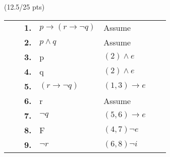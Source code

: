 \documentclass[a4paper,12pt]{article}
\begin{document}
\hfill \small{(12.5/25 pts)}\\
\begin{tcolorbox}
\begin{tabular}{|l|lrlll|l|} 
\hline
\multicolumn{1}{|l}{} &                       & \textbf{1.}  & $p\rightarrow (r\rightarrow \neg q)$                                               & Assume                                   & \multicolumn{1}{l}{} &                       \\ 
\cline{2-6}
                      &                       & \textbf{2.}  & $p\wedge q$                                                                        & Assume                                   &                      &                       \\
                      &                       & \textbf{3.}  & p                                                                                  & $(2) \wedge e $                              &                      &                       \\
                      &                       & \textbf{4.}  & q                                                                                  & $(2) \wedge e $                              &                      &                       \\
                      &                       & \textbf{5.}  & $(r\rightarrow \neg q)$                                                            & $(1, 3) \rightarrow e $                      &                      &                       \\ 
\cline{3-5}
                      & \multicolumn{1}{l|}{} & \textbf{6.}  & r                                                                                  & \multicolumn{1}{l|}{Assume}              &                      &                       \\
                      & \multicolumn{1}{l|}{} & \textbf{7.}  & $ \neg q $                                                                         & \multicolumn{1}{l|}{$(5, 6) \rightarrow e$ } &                      &                       \\
                      & \multicolumn{1}{l|}{} & \textbf{8.}  & F                                                                                  & \multicolumn{1}{l|}{$(4, 7) \neg e $ }       &                      &                       \\ 
\cline{3-5}
                      &                       & \textbf{9.}  & $ \neg r$                                                                          & $(6, 8) \neg i $                             &                      &                       \\ 

\end{tabular}
\end{tcolorbox}
\end{document}

